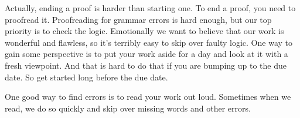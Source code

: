 \documentclass[12pt,fleqn]{article}
\newcounter{id}\setcounter{id}{0}
\newcounter{se}\setcounter{se}{0}
\begin{document}
Actually, ending a proof is harder than starting one. To end a proof, you need to proofread it.  Proofreading for grammar 
errors is hard enough, but our top priority is to check the logic. Emotionally we want to believe that our work is wonderful
and flawless, so it's terribly easy to skip over faulty logic.  One way to gain some perspective is to put your work aside for 
a day and look at it with a fresh viewpoint.  And that is hard to do that if you are bumping up to the due date. So 
get started long before the due date.

One good way to find errors is to read your work out loud. Sometimes when we read, we do so quickly and skip over missing
words and other errors.
\end{document}
